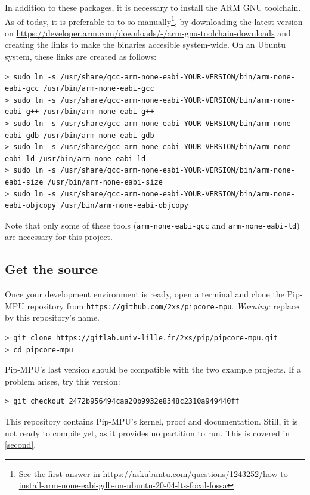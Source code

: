 \documentclass[10pt,a4paper,titlepage]{refart}
\begin{document}
In addition to these packages, it is necessary to install the ARM GNU toolchain. As of today, it is preferable to to so manually\footnote{See the first 
answer in \url{https://askubuntu.com/questions/1243252/how-to-install-arm-none-eabi-gdb-on-ubuntu-20-04-lts-focal-fossa}}, by downloading the latest version
on \url{https://developer.arm.com/downloads/-/arm-gnu-toolchain-downloads} and creating the links to make the binaries accesible system-wide. On an Ubuntu system, 
these links are created as follows:
\begin{lstlisting}[style=BashStyle]
> sudo ln -s /usr/share/gcc-arm-none-eabi-YOUR-VERSION/bin/arm-none-eabi-gcc /usr/bin/arm-none-eabi-gcc 
> sudo ln -s /usr/share/gcc-arm-none-eabi-YOUR-VERSION/bin/arm-none-eabi-g++ /usr/bin/arm-none-eabi-g++
> sudo ln -s /usr/share/gcc-arm-none-eabi-YOUR-VERSION/bin/arm-none-eabi-gdb /usr/bin/arm-none-eabi-gdb
> sudo ln -s /usr/share/gcc-arm-none-eabi-YOUR-VERSION/bin/arm-none-eabi-ld /usr/bin/arm-none-eabi-ld
> sudo ln -s /usr/share/gcc-arm-none-eabi-YOUR-VERSION/bin/arm-none-eabi-size /usr/bin/arm-none-eabi-size
> sudo ln -s /usr/share/gcc-arm-none-eabi-YOUR-VERSION/bin/arm-none-eabi-objcopy /usr/bin/arm-none-eabi-objcopy
\end{lstlisting}

Note that only some of these tools (\texttt{arm-none-eabi-gcc} and \texttt{arm-none-eabi-ld}) are necessary for this project.

\subsection{Get the source}
Once your development environment is ready, open a terminal and clone the Pip-MPU repository from \texttt{https://github.com/2xs/pipcore-mpu}.
\textit{Warning:} replace by this repository's name.

\begin{lstlisting}[style=BashStyle]
> git clone https://gitlab.univ-lille.fr/2xs/pip/pipcore-mpu.git
> cd pipcore-mpu
\end{lstlisting}

Pip-MPU's last version should be compatible with the two example projects. If a problem arises, try this version:

\begin{lstlisting}[style=BashStyle]
> git checkout 2472b956494caa20b9932e8348c2310a949440ff
\end{lstlisting}

This repository contains Pip-MPU's kernel, proof and documentation. Still,
it is not ready to compile yet, as it provides no partition to run.
This is covered in \cref{second}.
\end{document}
